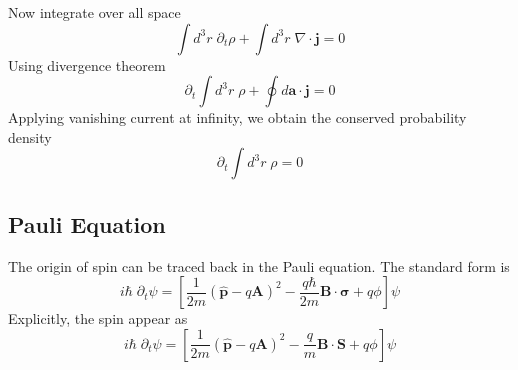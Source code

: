 \documentclass[../../../main.tex]{subfiles}
\begin{document}
Now integrate over all space
\begin{equation*}
    \int d^3r\;\partial_t \rho + \int d^3r\;\nabla \cdot  \mathbf{j} = 0
\end{equation*}
Using divergence theorem
\begin{equation*}
    \partial_t \int d^3r\;\rho + \oint d \mathbf{a}\cdot  \mathbf{j} = 0
\end{equation*}
Applying vanishing current at infinity, we obtain the conserved probability density
\begin{equation*}
    \partial_t \int d^3r\;\rho =0
\end{equation*}

\subsection{Pauli Equation}
The origin of spin can be traced back in the Pauli equation.
The standard form is
\begin{equation*}
    i\hbar \; \partial_t\psi
    =  \left[\frac{1}{2m}(\mathbf{{\hat{p}}}-q\mathbf{A}) ^{2}-\frac{q \hbar}{2m }\mathbf{B }\cdot  \boldsymbol{\sigma} +q\phi\right]\psi
\end{equation*}
Explicitly, the spin appear as
\begin{equation*}
    i\hbar \; \partial_t\psi
    =  \left[\frac{1}{2m}(\mathbf{{\hat{p}}}-q\mathbf{A}) ^{2}-\frac{q }{m }\mathbf{B }\cdot \mathbf{S} +q\phi\right]\psi
\end{equation*}
\end{document}
